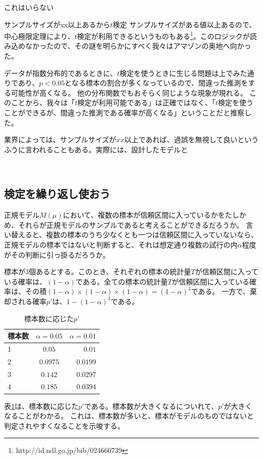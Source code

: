 これはいらない
\begin{SMbox}{サンプルサイズがxx以上あるから$t$検定}
        サンプルサイズがある値以上あるので、中心極限定理により、$t$検定が利用できるというものもある\footnote{http://id.ndl.go.jp/bib/024660739}。このロジックが読み込めなかったので、その謎を明らかにすべく我々はアマゾンの奥地へ向かった。

        データが指数分布的であるときに、$t$検定を使うときに生じる問題は上でみた通りであり、$p<0.05$となる標本の割合が多くなっているので、間違った推測をする可能性が高くなる。
        他の分布関数でもおそらく同じような現象が現れる。
        このことから、我々は「$t$検定が利用可能である」は正確ではなく、「$t$検定を使うことができるが、間違った推測である確率が高くなる」ということだと推察した。

        業界によっては、サンプルサイズが$xx$以上であれば、過誤を無視して良いというふうに言われることもある。実際には、設計したモデルと
\end{SMbox}
\fi
　
\subsection{検定を繰り返し使おう}
正規モデル$M(\mu)$において、複数の標本が信頼区間に入っているかをたしかめ、それらが正規モデルのサンプルであると考えることができるだろうか。
言い替えると、複数の標本のうち少なくとも一つは信頼区間に入っていないなら、正規モデルの標本ではないと判断すると、それは想定通り複数の試行の内$\alpha$程度がその判断に引っ掛るだろうか。

標本が$3$個あるとする。このとき、それぞれの標本の統計量$T$が信頼区間に入っている確率は、$(1-\alpha)$である。全ての標本の統計量$T$が信頼区間に入っている確率は、その積$(1-\alpha)\times(1-\alpha)\times(1-\alpha)=(1-\alpha)^3$である。
一方で、棄却される確率$p'$は、$1-(1-\alpha)^3$である。
\begin{table}[hbtp]
    \caption{標本数に応じた$p'$}
    \label{table:multiple_test_reject_prob}
    \centering
    \begin{tabular}{lcr}
      \hline
      標本数  & $\alpha=0.05$  &  $\alpha=0.01$ \\
      \hline \hline
       1 & $0.05$  & $0.01$ \\
       2 & $0.0975$ & $0.0199$\\
       3 & $0.142$ & $0.0297$\\
       4 & $0.185$ & $0.0394$\\
    \end{tabular}
  \end{table}
表\ref{table:multiple_test_reject_prob}は、標本数に応じた$p'$である。標本数が大きくなるについれて、$p'$が大きくなることがわかる。
これは、標本数が多いと、標本がモデルのものではないと判定されやすくなることを示唆する。

